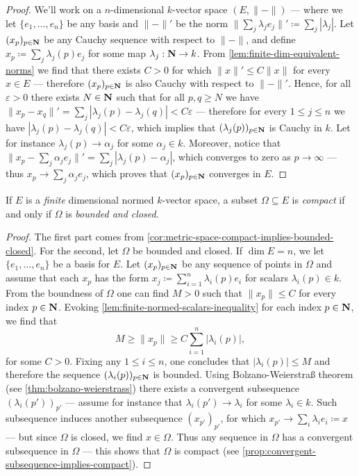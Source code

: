 \begin{proof}
We'll work on a \(n\)-dimensional \(k\)-vector space \((E, \| - \|)\) --- where
we let \(\{e_1, \dots, e_n\}\) be any basis and \(\| - \|'\) be the norm \(\|
\sum_j \lambda_j e_j \|' \coloneq \sum_j |\lambda_j|\). Let \((x_p)_{p \in \mathbf{N}}\)
be any Cauchy sequence with respect to \(\| - \|\), and define \(x_p \coloneq
\sum_j \lambda_j(p) e_j\) for some map \(\lambda_j: \mathbf{N} \to k\). From
\cref{lem:finite-dim-equivalent-norms} we find that there exists \(C > 0\) for
which \(\| x \|' \leq C \| x \|\) for every \(x \in E\) --- therefore \((x_p)_{p
\in \mathbf{N}}\) is also Cauchy with respect to \(\| - \|'\). Hence, for all
\(\varepsilon > 0\) there exists \(N \in \mathbf{N}\) such that for all \(p, q \geq N\)
we have \(\| x_p - x_q \|' = \sum_j |\lambda_j(p) - \lambda_j(q)| <
C \varepsilon\) --- therefore for every \(1 \leq j \leq n\) we have
\(|\lambda_j(p) - \lambda_j(q)| < C \varepsilon\), which implies that
\((\lambda_j(p))_{p \in \mathbf{N}}\) is Cauchy in \(k\). Let for instance
\(\lambda_j(p) \to \alpha_j\) for some \(\alpha_j \in k\). Moreover, notice that
\(\| x_p - \sum_j \alpha_j e_j\|' = \sum_j |\lambda_j(p) - \alpha_j|\), which
converges to zero as \(p \to \infty\) --- thus \(x_p \to \sum_j \alpha_j e_j\),
which proves that \((x_p)_{p \in \mathbf{N}}\) converges in \(E\).
\end{proof}

\begin{proposition}
\label{prop:compact-on-normed-space}
If \(E\) is a \emph{finite} dimensional normed \(k\)-vector space, a subset
\(\Omega \subseteq E\) is \emph{compact} if and only if \(\Omega\) is
\emph{bounded and closed}.
\end{proposition}

\begin{proof}
The first part comes from
\cref{cor:metric-space-compact-implies-bounded-closed}. For the second, let
\(\Omega\) be bounded and closed. If \(\dim E = n\), we let \(\{e_1, \dots,
e_n\}\) be a basis for \(E\). Let \((x_p)_{p \in \mathbf{N}}\) be any sequence of points
in \(\Omega\) and assume that each \(x_p\) has the form \(x_j\coloneq
\sum_{i=1}^n \lambda_i(p) e_i\) for scalars \(\lambda_i(p) \in k\). From the
boundness of \(\Omega\) one can find \(M > 0\) such that \(\| x_p \| \leq C\)
for every index \(p \in \mathbf{N}\). Evoking
\cref{lem:finite-normed-scalars-inequality} for each index \(p \in \mathbf{N}\), we find
that
\[
M \geq \| x_p \| \geq C \sum_{i=1}^n |\lambda_i(p)|,
\]
for some \(C > 0\). Fixing any \(1 \leq i \leq n\), one concludes that
\(|\lambda_i(p)| \leq M\) and therefore the sequence \((\lambda_i(p))_{p \in
\mathbf{N}}\) is bounded. Using Bolzano-Weierstra{\ss} theorem (see
\cref{thm:bolzano-weierstrass}) there exists a convergent subsequence
\((\lambda_i(p'))_{p'}\) --- assume for instance that \(\lambda_i(p') \to
\lambda_i\) for some \(\lambda_i \in k\). Such subsequence induces another
subsequence \((x_{p'})_{p'}\), for which \(x_{p'} \to \sum_i \lambda_i e_i
\coloneq x\) --- but since \(\Omega\) is closed, we find \(x \in \Omega\). Thus
any sequence in \(\Omega\) has a convergent subsequence in \(\Omega\) --- this
shows that \(\Omega\) is compact (see
\cref{prop:convergent-subsequence-implies-compact}).
\end{proof}

